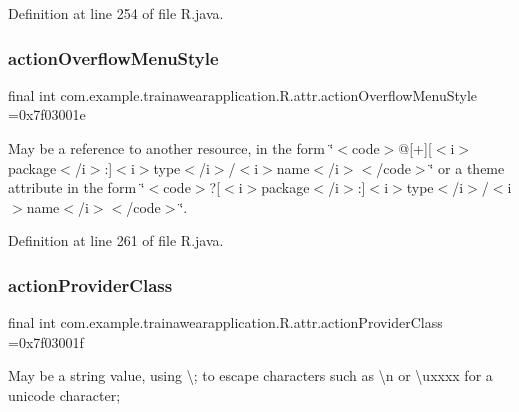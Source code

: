 Definition at line 254 of file R.\+java.

\mbox{\label{classcom_1_1example_1_1trainawearapplication_1_1_r_1_1attr_a45b1d23394b05195fc175e9ec97f7a70}} 
\subsubsection{\texorpdfstring{actionOverflowMenuStyle}{actionOverflowMenuStyle}}
{\footnotesize\ttfamily final int com.\+example.\+trainawearapplication.\+R.\+attr.\+action\+Overflow\+Menu\+Style =0x7f03001e\hspace{0.3cm}{\ttfamily [static]}}

May be a reference to another resource, in the form \char`\"{}$<$code$>$@\mbox{[}+\mbox{]}\mbox{[}$<$i$>$package$<$/i$>$\+:\mbox{]}$<$i$>$type$<$/i$>$/$<$i$>$name$<$/i$>$$<$/code$>$\char`\"{} or a theme attribute in the form \char`\"{}$<$code$>$?\mbox{[}$<$i$>$package$<$/i$>$\+:\mbox{]}$<$i$>$type$<$/i$>$/$<$i$>$name$<$/i$>$$<$/code$>$\char`\"{}. 

Definition at line 261 of file R.\+java.

\mbox{\label{classcom_1_1example_1_1trainawearapplication_1_1_r_1_1attr_aac67c6b5c8a53d8571519c54fff28a10}} 
\subsubsection{\texorpdfstring{actionProviderClass}{actionProviderClass}}
{\footnotesize\ttfamily final int com.\+example.\+trainawearapplication.\+R.\+attr.\+action\+Provider\+Class =0x7f03001f\hspace{0.3cm}{\ttfamily [static]}}

May be a string value, using \textquotesingle{}\textbackslash{};\textquotesingle{} to escape characters such as \textquotesingle{}\textbackslash{}n\textquotesingle{} or \textquotesingle{}\textbackslash{}uxxxx\textquotesingle{} for a unicode character; 

